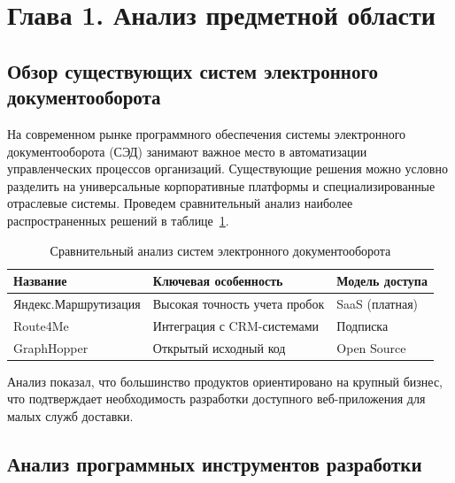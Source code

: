 \section*{Глава 1. Анализ предметной области}

\subsection{Обзор существующих систем электронного документооборота}

На современном рынке программного обеспечения системы электронного документооборота (СЭД) занимают важное место в автоматизации управленческих процессов организаций. Существующие решения можно условно разделить на универсальные корпоративные платформы и специализированные отраслевые системы. Проведем сравнительный анализ наиболее распространенных решений в таблице~\ref{tab:competitors}.

\begin{table}[ht!]
	\centering
	\caption{Сравнительный анализ систем электронного документооборота}
	\label{tab:competitors}
	\begin{tabular}{|l|p{}|l|}
		\hline
		\textbf{Название}    & \textbf{Ключевая \linebreak особенность} & \textbf{Модель доступа}  \\ \hline
		Яндекс.Маршрутизация & Высокая точность учета пробок            & SaaS (платная)           \\ \hline
		Route4Me             & Интеграция с CRM-системами               & Подписка                 \\ \hline
		GraphHopper          & Открытый исходный код                    & Open Source\footnotemark \\ \hline
	\end{tabular}
\end{table}


Анализ показал, что большинство продуктов ориентировано на крупный бизнес, что
подтверждает необходимость разработки доступного веб-приложения для малых служб
доставки.

\subsection{Анализ программных инструментов разработки}

